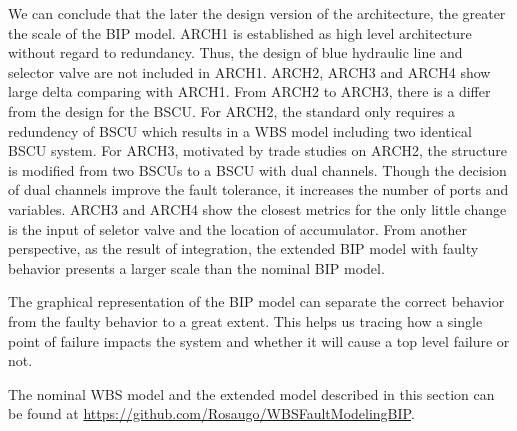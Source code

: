 We can conclude that the later the design version of the architecture, the greater the scale of the BIP model.
ARCH1 is established as high level architecture without regard to redundancy. Thus, the design of blue hydraulic line and selector valve are not included in ARCH1.
ARCH2, ARCH3 and ARCH4 show large delta comparing with ARCH1.
From ARCH2 to ARCH3, there is a differ from the design for the BSCU.
For ARCH2, the standard only requires a redundency of BSCU which results in a WBS model including two identical BSCU system. For ARCH3, motivated by trade studies on ARCH2, the structure is modified from two BSCUs to a BSCU with dual channels.
Though the decision of dual channels improve the fault tolerance, it increases the number of ports and variables.
ARCH3 and ARCH4 show the closest metrics for the only little change is the input of seletor valve and the location of accumulator.
From another perspective, as the result of integration, the extended BIP model with faulty behavior presents a larger scale than the nominal BIP model.

The graphical representation of the BIP model can separate the correct behavior from the faulty behavior to a great extent. This helps us tracing how a single point of failure impacts the system and whether it will cause a top level failure or not.


The nominal WBS model and the extended model described in this section can be found at \href{https://github.com/Rosaugo/WBSFaultModelingBIP}{https://github.com/Rosaugo/WBSFaultModelingBIP}. 

